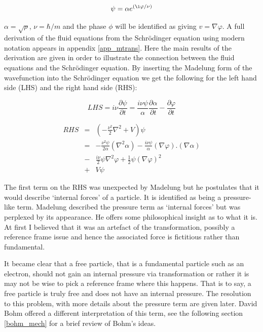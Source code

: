\begin{equation}
\label{eqn_mad}
\psi = \alpha e^{(\i \varphi/\nu)}
\end{equation}

\noindent $\alpha = \sqrt{\rho}$, $\nu = \hbar/m$ and the phase $\phi$ will be identified as giving $v = \nabla \varphi$. A full derivation of the fluid equations from the Schr\"odinger equation using modern notation appears in appendix \ref{app_mtrans}. Here the main results of the derivation are given in order to illustrate the connection between the fluid equations and the Schr\"odinger equation. By inserting the Madelung form of the wavefunction into the Schr\"odinger equation we get the following for the left hand side (LHS) and the right hand side (RHS):

\begin{equation}
LHS = i\nu\frac{\partial\psi}{\partial t}=\frac{i\nu\psi}{\alpha}\frac{\partial\alpha}{\partial t} - \frac{\partial\varphi}{\partial t}
\end{equation}

\begin{eqnarray}
RHS	&=& \left( -\frac{\nu^2}{2} \nabla^2 + V \right) \psi \\ \nonumber
	&=& -\frac{\nu^2\psi}{2\alpha}(\nabla^2\alpha) -\frac{i\nu\psi}{\alpha}(\nabla\varphi).(\nabla\alpha) \\ \nonumber
	&-&\frac{i\nu}{2}\psi\nabla^2\varphi + \frac{1}{2}\psi(\nabla\varphi)^2 \\ \nonumber
	&+& V \psi
\end{eqnarray}

\noindent The first term on the RHS was unexpected by Madelung but he postulates that it would describe `internal forces' of a particle. It is identified as being a pressure-like term. Madelung described the pressure term as `internal forces' but was perplexed by its appearance. He offers some philosophical insight as to what it is. At first I believed that it was an artefact of the transformation, possibly a reference frame issue and hence the associated force is fictitious rather than fundamental.

It became clear that a free particle, that is a fundamental particle such as an electron, should not gain an internal pressure via transformation or rather it is may not be wise to pick a reference frame where this happens.  That is to say, a free particle is truly free and does not have an internal pressure. The resolution to this problem, with more details about the pressure term are given later. David Bohm offered a different interpretation of this term, see the following section \ref{bohm_mech} for a brief review of Bohm's ideas.

